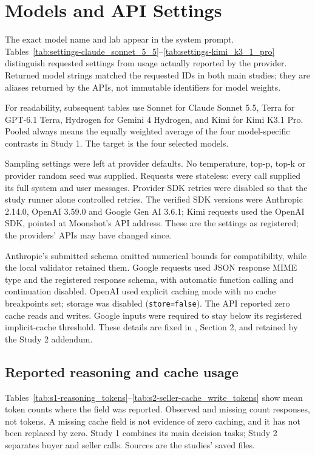 \section{Models and API Settings}
\label{app:models}
The exact model name and lab appear in the system prompt. Tables~\ref{tab:settings-claude_sonnet_5_5}--\ref{tab:settings-kimi_k3_1_pro} distinguish requested settings from usage actually reported by the provider. Returned model strings matched the requested IDs in both main studies; they are aliases returned by the APIs, not immutable identifiers for model weights.

For readability, subsequent tables use Sonnet for Claude Sonnet 5.5, Terra for GPT-6.1 Terra, Hydrogen for Gemini 4 Hydrogen, and Kimi for Kimi K3.1 Pro. Pooled always means the equally weighted average of the four model-specific contrasts in Study 1. The target is the four selected models.


Sampling settings were left at provider defaults. No temperature, top-p, top-k or provider random seed was supplied. Requests were stateless: every call supplied its full system and user messages. Provider SDK retries were disabled so that the study runner alone controlled retries. The verified SDK versions were Anthropic 2.14.0, OpenAI 3.59.0 and Google Gen AI 3.6.1; Kimi requests used the OpenAI SDK, pointed at Moonshot's API address. These are the settings as registered; the providers' APIs may have changed since.

Anthropic's submitted schema omitted numerical bounds for compatibility, while the local validator retained them. Google requests used JSON response MIME type and the registered response schema, with automatic function calling and continuation disabled. OpenAI used explicit caching mode with no cache breakpoints set; storage was disabled (\lstinline!store=false!). The API reported zero cache reads and writes. Google inputs were required to stay below its registered implicit-cache threshold. These details are fixed in , Section 2, and retained by the Study 2 addendum.

\subsection{Reported reasoning and cache usage}
\label{subapp:reported-reasoning-and-cache-usage}
Tables~\ref{tab:s1-reasoning_tokens}--\ref{tab:s2-seller-cache_write_tokens} show mean token counts where the field was reported. Observed and missing count responses, not tokens. A missing cache field is not evidence of zero caching, and it has not been replaced by zero. Study 1 combines its main decision tasks; Study 2 separates buyer and seller calls. Sources are the studies' saved  files.


